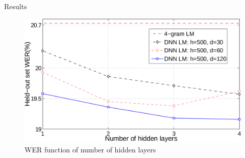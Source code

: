 \documentclass{beamer}
\begin{document}
\begin{frame}{Results}
	\begin{figure}[!htb]
		\centering
	    \includegraphics[width=0.8\linewidth]{./images/results1.png}
	    \caption{WER function of number of hidden layers}
	\end{figure}
\end{frame}
\end{document}
